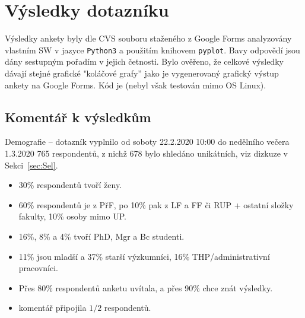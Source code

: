 \documentclass[a4paper,twoside]{article}
\begin{document}
\newpage
\section{Výsledky dotazníku}
Výsledky ankety byly dle CVS souboru staženého z Google Forms analyzovány vlastním SW v jazyce {\tt Python3} a použitím knihovem {\tt pyplot}.
Bavy odpovědí jsou dány sestupným pořadím v jejich četnosti.
Bylo ověřeno, že celkové výsledky dávají stejné grafické "koláčové grafy'' jako je vygenerovaný grafický výstup ankety na Google Forms.
Kód je  (nebyl však testován mimo OS Linux).

\subsection{Komentář k výsledkům}
Demografie -- dotazník vyplnilo od soboty 22.2.2020 10:00 do nedělního večera 1.3.2020 765 respondentů, z nichž 678 bylo shledáno unikátních, viz dizkuze v Sekci~\ref{sec:Sel}.
\begin{itemize}
  \item 30\% respondentů tvoří ženy.
  \item 60\% respondentů je z PřF, po 10\% pak z LF a FF či RUP + ostatní složky fakulty, 10\% osoby mimo UP.
  \item 16\%, 8\% a 4\% tvoří PhD, Mgr a Bc studenti.
  \item 11\% jsou mladší a 37\% starší výzkumníci, 16\% THP/administrativní pracovníci.
  \item Přes 80\% respondentů anketu uvítala, a přes 90\% chce znát výsledky.
  \item komentář připojila $1/2$ respondentů.
\end{itemize}
\end{document}
